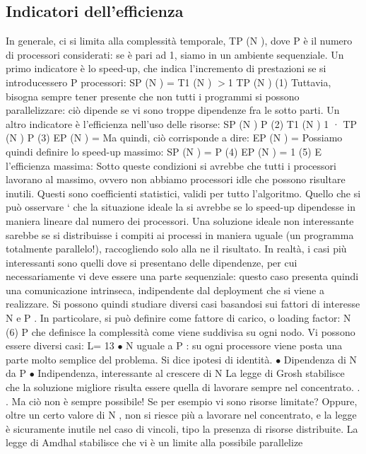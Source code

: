 \subsection{Indicatori dell'efficienza}
In generale, ci si limita alla complessità temporale, TP (N ), dove P è il numero
di processori considerati: se è pari ad 1, siamo in un ambiente sequenziale.
Un primo indicatore è lo speed-up, che indica l'incremento di prestazioni se si
introducessero P processori:
SP (N ) =
T1 (N )
$>$1
TP (N )
(1)
Tuttavia, bisogna sempre tener presente che non tutti i programmi si possono
parallelizzare: ciò dipende se vi sono troppe dipendenze fra le sotto parti.
Un altro indicatore è l'efficienza nell'uso delle risorse:
SP (N )
P
(2)
T1 (N ) 1
·
TP (N ) P
(3)
EP (N ) =
Ma quindi, ciò corrisponde a dire:
EP (N ) =
Possiamo quindi definire lo speed-up massimo:
SP (N ) = P
(4)
EP (N ) = 1
(5)
E l'efficienza massima:
Sotto queste condizioni si avrebbe che tutti i processori lavorano al massimo,
ovvero non abbiamo processori idle che possono risultare inutili. Questi sono
coefficienti statistici, validi per tutto l'algoritmo. Quello che si può osservare `
che la situazione ideale la si avrebbe se lo speed-up dipendesse in maniera lineare dal numero dei processori. Una
soluzione ideale non interessante sarebbe
se si distribuisse i compiti ai processi in maniera uguale (un programma totalmente parallelo!), raccogliendo solo alla
ne il risultato. In realtà, i casi più
interessanti sono quelli dove si presentano delle dipendenze, per cui necessariamente vi deve essere una parte
sequenziale: questo caso presenta quindi una
comunicazione intrinseca, indipendente dal deployment che si viene a realizzare.
Si possono quindi studiare diversi casi basandosi sui fattori di interesse N e
P . In particolare, si può definire come fattore di carico, o loading factor:
N
(6)
P
che definisce la complessità come viene suddivisa su ogni nodo. Vi possono
essere diversi casi:
L=
13
$\bullet$ N uguale a P : su ogni processore viene posta una parte molto semplice
del problema. Si dice ipotesi di identità.
$\bullet$ Dipendenza di N da P
$\bullet$ Indipendenza, interessante al crescere di N
La legge di Grosh stabilisce che la soluzione migliore risulta essere quella di lavorare sempre nel concentrato. . . Ma
ciò non è sempre possibile! Se per esempio
vi sono risorse limitate? Oppure, oltre un certo valore di N , non si riesce più
a lavorare nel concentrato, e la legge è sicuramente inutile nel caso di vincoli,
tipo la presenza di risorse distribuite.
La legge di Amdhal stabilisce che vi è un limite alla possibile parallelize
